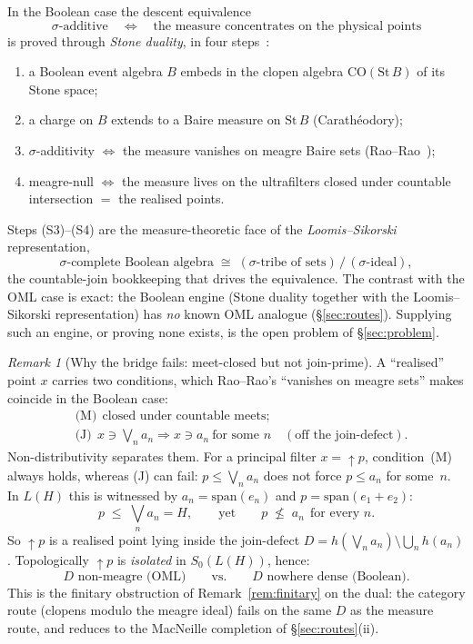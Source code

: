 \documentclass[11pt,reqno]{amsart}
\theoremstyle{plain}
\theoremstyle{definition}
\theoremstyle{remark}
\newtheorem{remark}[theorem]{Remark}
\newcommand{\CO}{\mathrm{CO}}
\begin{document}
In the Boolean case the descent equivalence
\[
  \sigma\text{-additive}
  \quad\Longleftrightarrow\quad
  \text{the measure concentrates on the physical points}
\]
is proved through \emph{Stone duality}, in four steps~\cite{mahon2025}:
\begin{enumerate}[label=\textup{(S\arabic*)}, noitemsep, topsep=2pt]
  \item a Boolean event algebra $B$ embeds in the clopen algebra
    $\CO(\mathrm{St}\,B)$ of its Stone space;
  \item a charge on $B$ extends to a Baire measure on $\mathrm{St}\,B$
    (Carath\'{e}odory);
  \item $\sigma$-additivity $\iff$ the measure vanishes on meagre Baire sets
    (Rao--Rao~\cite{rao1983});
  \item meagre-null $\iff$ the measure lives on the ultrafilters closed under
    countable intersection $=$ the realised points.
\end{enumerate}
Steps (S3)--(S4) are the measure-theoretic face of the
\emph{Loomis--Sikorski} representation,
\[
  \text{$\sigma$-complete Boolean algebra}
  \;\cong\;
  (\text{$\sigma$-tribe of sets})\,/\,(\text{$\sigma$-ideal}),
\]
the countable-join bookkeeping that drives the equivalence. The contrast with
the OML case is exact: the Boolean engine (Stone duality together with the
Loomis--Sikorski representation) has \emph{no} known OML analogue
(\S\ref{sec:routes}). Supplying such an engine, or proving none exists, is the open
problem of \S\ref{sec:problem}.

\begin{remark}[Why the bridge fails: meet-closed but not join-prime]
\label{rem:bridge}
A ``realised'' point $x$ carries two conditions, which Rao--Rao's
``vanishes on meagre sets'' makes coincide in the Boolean case:
\[
  \begin{aligned}
  &\text{(M)}\ \ \text{closed under countable meets};\\
  &\text{(J)}\ \ x\ni\textstyle\bigvee_n a_n \Rightarrow x\ni a_n\ \text{for some }n
    \quad(\text{off the join-defect}).
  \end{aligned}
\]
Non-distributivity separates them. For a principal filter $x={\uparrow}p$,
condition~(M) always holds, whereas (J) can fail: $p\leq\bigvee_n a_n$ does not
force $p\leq a_n$ for some~$n$.
In $L(H)$ this is witnessed by $a_n=\mathrm{span}(e_n)$ and
$p=\mathrm{span}(e_1+e_2)$:
\[
  p \;\leq\; \textstyle\bigvee_n a_n = H,
  \qquad\text{yet}\qquad
  p \;\not\leq\; a_n \ \ \text{for every } n.
\]
So ${\uparrow}p$ is a realised point lying inside the join-defect
$D = h(\bigvee_n a_n)\setminus\bigcup_n h(a_n)$. Topologically ${\uparrow}p$ is
\emph{isolated} in $S_0(L(H))$, hence:
\[
  D \text{ non-meagre (OML)}
  \qquad\text{vs.}\qquad
  D \text{ nowhere dense (Boolean)}.
\]
This is the finitary obstruction of Remark~\ref{rem:finitary} on the dual:
the category route (clopens modulo the meagre ideal) fails on the same $D$
as the measure route, and reduces to the MacNeille completion of
\S\ref{sec:routes}(ii).
\end{remark}
\end{document}
